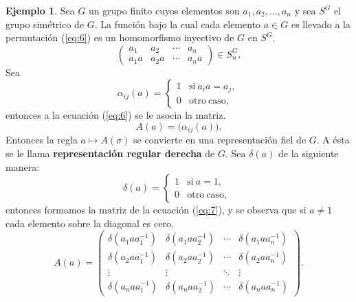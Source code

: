 \documentclass[12pt]{book}
\theoremstyle{definition}
\newtheorem{example}[theorem]{Ejemplo}
\newcounter{in}
\newcounter{ini}
\begin{document}
\begin{example}
  \label{Ej4}
  Sea $G$ un grupo finito cuyos elementos son $a_{1},a_{2},...,a_{n}$
  y sea $S^{G}$ el grupo simétrico de $G$. La función bajo la cual
  cada elemento $a \in G$ es llevado a la permutación (\ref{eq:6}) es un
  homomorfismo inyectivo de $G$ en $S^{G}$.
  \begin{equation}
    \label{eq:6}
    \begin{pmatrix}
      a_{1} & a_{2} & \cdots  & a_{n}\\
      a_{1}a & a_{2}a & \cdots & a_{n}a
    \end{pmatrix} 
    \in S_{n}^{G}.
  \end{equation}
  Sea
  \begin{equation*}
    \alpha_{ij} (a) = \left\{
      \begin{array}{ll}
        1      & \mathrm{si\ } a_{i}a = a_{j}, \\
        0      & \mathrm{otro\ caso,\ }
      \end{array}
    \right. 
  \end{equation*}
  entonces a la ecuación (\ref{eq:6}) se le asocia la matriz. 
  \begin{equation*}
    A(a)=\big(\alpha_{ij}(a)\big).
  \end{equation*} 
  Entonces la regla $a \mapsto A\left(\sigma\right)$ se convierte en
una representación fiel de $G$. A ésta se le llama
\textbf{representación regular derecha} de $G$. Sea $\delta{(a)}$ de
la siguiente manera:
  \begin{equation*}
    \delta{(a)} = \left\{
      \begin{array}{ll}
        1      & \mathrm{si\ } a = 1, \\
        0      & \mathrm{otro\ caso,\ } 
      \end{array}
    \right.
  \end{equation*}
  entonces formamos la matriz de la ecuación (\ref{eq:7}), y se observa que si
  $a \neq 1$ cada elemento sobre la diagonal es cero.
  \begin{equation}
    \label{eq:7}
    A\left(a\right) = 
    \begin{pmatrix}
      \delta\left(a_{1}aa_{1}^{-1}\right) & \delta\left(a_{1}aa_{2}^{-1}\right) & \cdots  & \delta\left(a_{1}aa_{n}^{-1}\right)\\
      \delta\left(a_{2}aa_{1}^{-1}\right) & \delta\left(a_{2}aa_{2}^{-1}\right) & \cdots  & \delta\left(a_{2}aa_{n}^{-1}\right)\\ 
      \vdots & \vdots & \ddots & \vdots\\
      \delta\left(a_{n}aa_{1}^{-1}\right) & \delta\left(a_{n}aa_{2}^{-1}\right) & \cdots  & \delta\left(a_{n}aa_{n}^{-1}\right)
    \end{pmatrix}
    .
  \end{equation}


\end{example}
\end{document}
